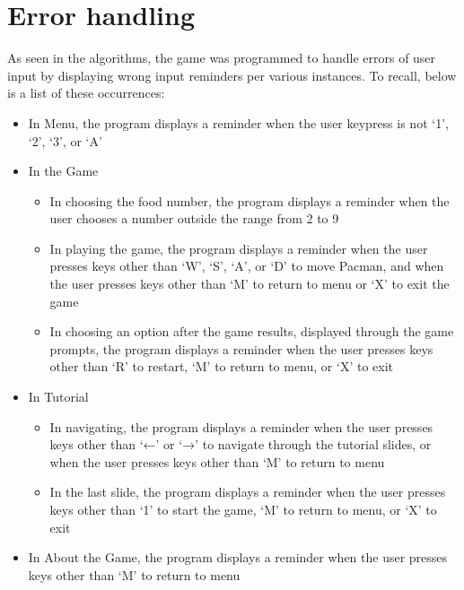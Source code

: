 
\section{Error handling}

As seen in the algorithms, the game was programmed to handle errors of user
input by displaying wrong input reminders per various instances. To recall,
below is a list of these occurrences:\\
    \begin{itemize}[label={}]
        \item In Menu, the program displays a reminder when the user keypress is not `1', `2', `3', or `A'
        \item In the Game
            \begin{itemize}[label={}]
                \item In choosing the food number, the program displays a
                    reminder when the user chooses a number outside the range
                    from 2 to 9 \item In playing the game, the program displays
                    a reminder when the user presses keys other than `W', `S',
                    `A', or `D' to move Pacman, and when the user presses keys
                    other than `M' to return to menu or `X' to exit the game
                \item In choosing an option after the game results, displayed
                    through the game prompts, the program displays a reminder
                    when the user presses keys other than `R' to restart, `M'
                    to return to menu, or `X' to exit
            \end{itemize}
        \item In Tutorial
            \begin{itemize}[label={}]
                \item In navigating, the program displays a reminder when the
                    user presses keys other than `←' or `→' to navigate through
                    the tutorial slides, or when the user presses keys other than
                    `M' to return to menu
                \item In the last slide, the program
                    displays a reminder when the user presses keys other than
                    `1' to start the game, `M' to return to menu, or `X' to
                    exit
            \end{itemize}
        \item In About the Game, the program displays a reminder when the user presses keys other than `M' to return to menu
    \end{itemize}
